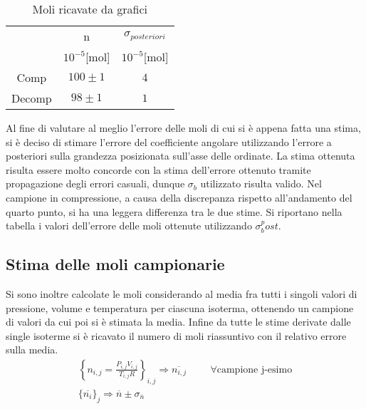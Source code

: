 \documentclass[a4paper,11pt,oneside]{article}
\begin{document}
\begin{table}[h!]
    \centering
    \begin{tabular}{|c|c|c|}
        \cline{2-3}
        \multicolumn{1}{c|}{}& n & $\sigma_{posteriori}$\\ 
        \multicolumn{1}{c|}{}& $10^{-5}$[mol] & $10^{-5}$[mol]\\\hline
        \rowcolor[rgb]{0.85,0.85,0.85}Comp & $100\pm1$ & $4$\\ \hline
        Decomp & $98\pm1$ & $1$\\ \hline
    \end{tabular}
    \caption{Moli ricavate da grafici}
    \label{tab:moli_grafici}
\end{table}

Al fine di valutare al meglio l'errore delle moli di cui si è appena fatta una stima, si è deciso di stimare l'errore del coefficiente angolare utilizzando l'errore a posteriori sulla grandezza posizionata sull'asse delle ordinate. La stima ottenuta risulta essere molto concorde con la stima  dell'errore ottenuto tramite propagazione degli errori casuali, dunque $\sigma_b$ utilizzato risulta valido. Nel campione in compressione, a causa della discrepanza rispetto all'andamento del quarto punto, si ha una leggera differenza tra le due stime.
Si riportano nella tabella i valori dell'errore delle moli ottenute utilizzando $\sigma_b^post$.









\subsection{Stima delle moli campionarie}
Si sono inoltre calcolate le moli considerando al media fra tutti i singoli valori di pressione, volume e temperatura per ciascuna isoterma, ottenendo un campione di valori da cui poi si è stimata la media. Infine da tutte le stime derivate dalle single isoterme si è ricavato il numero di moli riassuntivo con il relativo errore sulla media.
\begin{gather*}
    \left \{n_{i, j}=\frac{P_{i, j}V_{i, j}}{T_{i, j}R}\right \}_{i, j} \Rightarrow \overline{n_{i, j}} \hspace{1cm}\forall \text{campione j-esimo}\\
    \{\overline{n_{i}}\}_{j} \Rightarrow \overline{n}\pm \sigma_{\overline{n}}
\end{gather*}
\end{document}
